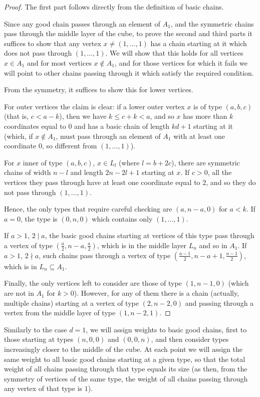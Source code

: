 \documentclass[11pt, reqno]{amsart}
\theoremstyle{remark}
\numberwithin{equation}{section}
\newcommand{\theonepoint}{(1, \ldots, 1)}
\begin{document}
\begin{proof}
    The first part follows directly from the definition of basic chains.

    Since any good chain passes through an element of $A_1$, and the symmetric chains pass through the middle layer of the cube, to prove the second and third parts it suffices to show that any vertex $x \neq \theonepoint$ has a chain starting at it which does not pass through $\theonepoint$. We will show that this holds for all vertices $x \in A_1$ and for most vertices $x \notin A_1$, and for those vertices for which it fails we will point to other chains passing through it which satisfy the required condition.

    From the symmetry, it suffices to show this for lower vertices.

    For outer vertices the claim is clear: if a lower outer vertex $x$ is of type $(a, b, c)$ (that is, $c<a-k$), then we have $k \leqslant c+k<a$, and so $x$ has more than $k$ coordinates equal to $0$ and has a basic chain of length $kd+1$ starting at it (which, if $x \notin A_1$, must pass through an element of $A_1$ with at least one coordinate $0$, so different from $(1, \dots, 1)$).

    For $x$ inner of type $(a, b, c)$, $x \in L_l$ (where $l=b+2c$), there are symmetric chains of width $n-l$ and length $2n-2l+1$ starting at $x$. If $c>0$, all the vertices they pass through have at least one coordinate equal to $2$, and so they do not pass through $\theonepoint$.
    
    Hence, the only types that require careful checking are $(a, n-a, 0)$ for $a < k$. If $a=0$, the type is $(0, n, 0)$ which contains only $\theonepoint$.
    
    If $a>1$, $2 \mid a$, the basic good chains starting at vertices of this type pass through a vertex of type $(\frac{a}{2}, n-a, \frac{a}{2})$, which is in the middle layer $L_n$ and so in $A_1$. If $a>1$, $2 \nmid a$, such chains pass through a vertex of type $(\frac{a-1}{2}, n-a+1, \frac{a-1}{2})$, which is in $L_n \subseteq A_1$.

    Finally, the only vertices left to consider are those of type $(1, n-1, 0)$ (which are not in $A_1$ for $k>0$). However, for any of them there is a chain (actually, multiple chains) starting at a vertex of type $(2, n-2, 0)$ and passing through a vertex from the middle layer of type $(1, n-2, 1)$.
\end{proof}

Similarly to the case $d=1$, we will assign weights to basic good chains, first to those starting at types $(n, 0, 0)$ and $(0, 0, n)$, and then consider types increasingly closer to the middle of the cube. At each point we will assign the same weight to all basic good chains starting at a given type, so that the total weight of all chains passing through that type equals its size (as then, from the symmetry of vertices of the same type, the weight of all chains passing through any vertex of that type is $1$).
\end{document}
